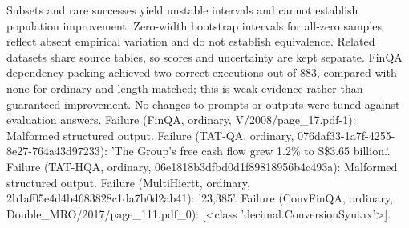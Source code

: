 Subsets and rare successes yield unstable intervals and cannot establish population improvement. Zero-width bootstrap intervals for all-zero samples reflect absent empirical variation and do not establish equivalence. Related datasets share source tables, so scores and uncertainty are kept separate. FinQA dependency packing achieved two correct executions out of 883, compared with none for ordinary and length matched; this is weak evidence rather than guaranteed improvement. No changes to prompts or outputs were tuned against evaluation answers.
Failure (FinQA, ordinary, V/2008/page\_17.pdf-1): Malformed structured output.
Failure (TAT-QA, ordinary, 076daf33-1a7f-4255-8e27-764a43d97233): 'The Group’s free cash flow grew 1.2\% to S\$3.65 billion.'.
Failure (TAT-HQA, ordinary, 06e1818b3dfbd0d1f89818956b4c493a): Malformed structured output.
Failure (MultiHiertt, ordinary, 2b1af05e4d4b4683828c1da7b0d2ab41): '23,385'.
Failure (ConvFinQA, ordinary, Double\_MRO/2017/page\_111.pdf\_0): [<class 'decimal.ConversionSyntax'>].
